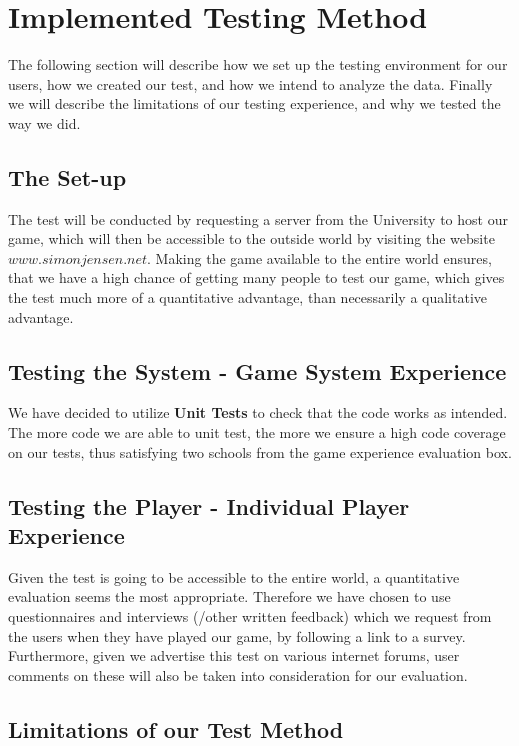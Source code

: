 \section{Implemented Testing Method}
\label{sec:test_method}

The following section will describe how we set up the testing environment for our users, how we created our test, and how we intend to analyze the data. Finally we will describe the limitations of our testing experience, and why we tested the way we did.

\subsection{The Set-up}

The test will be conducted by requesting a server from the University to host our game, which will then be accessible to the outside world by visiting the website $www.simonjensen.net$.
Making the game available to the entire world ensures, that we have a high chance of getting many people to test our game, which gives the test much more of a quantitative advantage, than necessarily a qualitative advantage.

\subsection{Testing the System - Game System Experience}

We have decided to utilize \textbf{Unit Tests} to check that the code works as intended.
The more code we are able to unit test, the more we ensure a high code coverage on our tests, thus satisfying two schools from the game
experience evaluation box.

\subsection{Testing the Player - Individual Player Experience}

Given the test is going to be accessible to the entire world, a quantitative evaluation seems the most appropriate. Therefore we have chosen to use questionnaires and interviews (/other written feedback) which we request from the users when they have played our game, by following a link to a survey. Furthermore, given we advertise this test on various internet forums, user comments on these will also be taken into consideration for our evaluation.

\subsection{Limitations of our Test Method}

